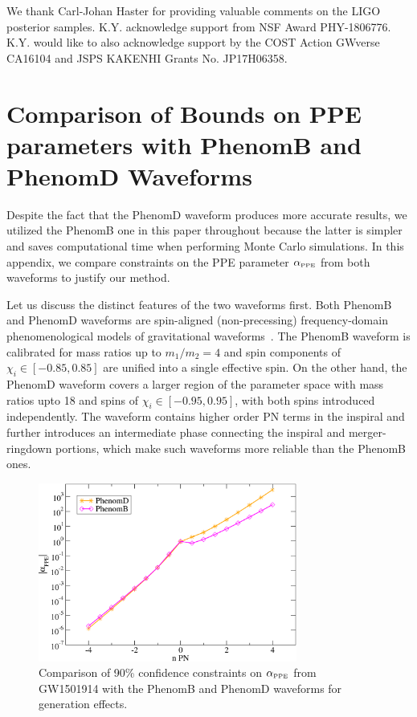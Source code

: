 \documentclass[prd,twocolumn,nofootinbib]{revtex4-1}
\newcommand{\PPE}{{\mbox{\tiny PPE}}}
\begin{document}
\acknowledgments

We thank Carl-Johan Haster for providing valuable comments on the LIGO posterior samples. 
K.Y. acknowledge support from NSF Award PHY-1806776. 
K.Y. would like to also acknowledge support by the COST Action GWverse CA16104 and JSPS KAKENHI Grants No. JP17H06358.

 \appendix 
\section{Comparison of Bounds on PPE parameters with PhenomB and PhenomD Waveforms}\label{Appendix}

Despite the fact that the PhenomD waveform produces more accurate results, we utilized the PhenomB one in this paper throughout because the latter is simpler and saves computational time when performing Monte Carlo simulations. In this appendix, we compare constraints on the PPE parameter $\alpha_\PPE$ from both waveforms to justify our method. 
 
Let us discuss the distinct features of the two waveforms first. Both PhenomB and PhenomD waveforms are spin-aligned (non-precessing) frequency-domain phenomenological models of gravitational waveforms~\cite{Ajith:2009bn,Khan:2015jqa}. The PhenomB waveform is calibrated for mass ratios up to $m_1/m_2 = 4$ and spin components of $\chi_i\in[-0.85,0.85]$ are unified into a single effective spin. On the other hand, the PhenomD waveform covers a larger region of the parameter space with mass ratios upto 18 and spins of $\chi_i\in[-0.95,0.95]$, with both spins introduced independently. The waveform contains higher order PN terms in the inspiral and further introduces an intermediate phase connecting the inspiral and merger-ringdown portions,
which make such waveforms more reliable than the PhenomB ones.

\begin{figure}[htb]
\includegraphics[width=8.5cm]{phenomBvsphenomD.pdf}
\caption{Comparison of 90\% confidence constraints on $\alpha_{\PPE}$ from GW1501914 with the PhenomB and PhenomD waveforms for generation effects. }
\label{fig:phenomBvsD}
\end{figure}
\end{document}
